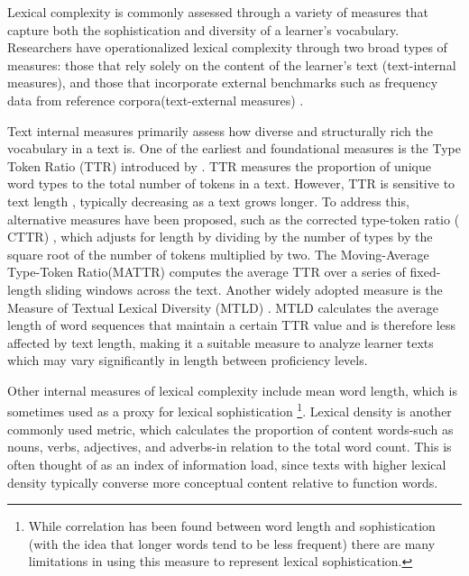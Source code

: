 
Lexical complexity is commonly assessed through a variety of measures that capture both the sophistication and
diversity of a learner's vocabulary. Researchers have operationalized lexical complexity through two broad types of
measures: those that rely solely on the content of the learner's text (text-internal measures), and those that incorporate external benchmarks such as frequency data from reference
corpora(text-external measures) \citep{Butle2012}.

Text internal measures primarily assess how diverse and structurally rich the vocabulary in a text is.
One of the
earliest
and
foundational measures is the Type Token Ratio (TTR) introduced by \citet{Templin1957}. TTR measures the proportion of
unique word types to the total number of tokens in a text. However, TTR is sensitive to text
length
\citep{koizumi2012}, typically decreasing as a text grows longer. To address this, alternative measures have been
proposed, such as the corrected type-token ratio (
CTTR)
\citep{Carroll1964}, which adjusts for length by dividing by the number of types by the square root of the
number of tokens multiplied by two. The Moving-Average Type-Token Ratio(MATTR) \citep{Covington2010} computes the
average TTR over a series of fixed-length sliding windows across the text. Another widely
adopted measure is the Measure of Textual Lexical Diversity (MTLD)
\citep{McCarthy2010}. MTLD
calculates the average length of word
sequences that maintain a certain TTR value and is therefore less affected by text length, making it a suitable
measure to analyze learner texts which may vary significantly in length between proficiency levels.

Other internal measures
 of lexical complexity include
mean word length, which is sometimes used as a proxy for lexical sophistication
\footnote{ While correlation has been found between word length and sophistication (with the idea that longer words
tend to be less frequent) there are many limitations in using this measure to represent lexical sophistication.\citep{Laufer1995}}.
Lexical density is another commonly used metric, which calculates the proportion
of content words-such as nouns, verbs, adjectives, and adverbs-in relation to the total word count. This is often
thought of as an index of information load, since texts with higher lexical density typically converse more
conceptual content relative to function words.

